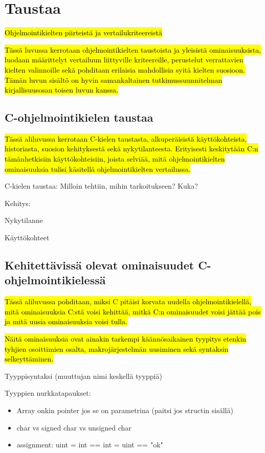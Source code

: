 \section{Taustaa}

\hl{Ohjelmointikielten piirteistä ja vertailukriteereistä}

\hl{Tässä luvussa kerrotaan ohjelmointikielten taustoista ja yleisistä
ominaisuuksista, luodaan määrittelyt vertailuun liittyville kriteereille,
perustelut verrattavien kielten valinnoille sekä pohditaan erilaisia
mahdollisia syitä kielten suosioon. Tämän luvun sisältö on hyvin samankaltainen
tutkimussuunnitelman kirjallisuusosan toisen luvun kanssa.}

\subsection{C-ohjelmointikielen taustaa}
\label{sec:ctaustaa}

\hl{Tässä aliluvussa kerrotaan C-kielen taustasta, alkuperäisistä käyttökohteista,
historiasta, suosion kehityksestä sekä nykytilanteesta. Erityisesti keskitytään
C:n tämänhetkisiin käyttökohteisiin, joista selviää, mitä ohjelmointikielten
ominaisuuksia tulisi käsitellä ohjelmointikielten vertailussa.}

C-kielen taustaa:
Milloin tehtiin, mihin tarkoitukseen? Kuka?

Kehitys:

Nykytilanne

Käyttökohteet

\subsection{Kehitettävissä olevat ominaisuudet C-ohjelmointikielessä}

\hl{Tässä aliluvussa pohditaan, miksi C pitäisi korvata uudella
ohjelmointikielellä, mitä ominaisuuksia C:stä voisi kehittää, mitkä C:n
ominaisuudet voisi jättää pois ja mitä uusia ominaisuuksia voisi tulla.}

\hl{Näitä ominaisuuksia ovat ainakin tarkempi käännösaikainen tyypitys etenkin
tyhjien osoittimien osalta, makrojärjestelmän uusiminen sekä syntaksin
selkeyttäminen.}

Tyyppisyntaksi (muuttujan nimi keskellä tyyppiä)

Tyyppien nurkkatapaukset:
\begin{itemize}
    \item Array onkin pointer jos se on parametrina (paitsi jos structin sisällä)
    \item char vs signed char vs unsigned char
    \item assignment: uint = int == int = uint == "ok"
\end{itemize}

